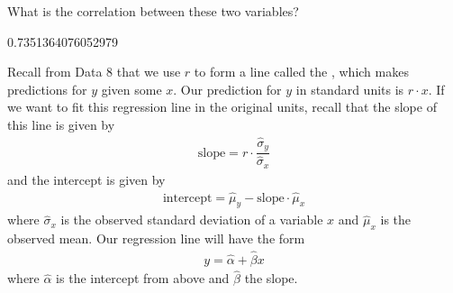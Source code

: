 \documentclass[letterpaper,10pt,english]{jupyterBook}
\begin{document}
\begin{sphinxVerbatim}[commandchars=\\\{\}]
  
       
\end{sphinxVerbatim}

\sphinxAtStartPar
What is the correlation between these two variables?

\begin{sphinxVerbatim}[commandchars=\\\{\}]
 
\end{sphinxVerbatim}

\begin{sphinxVerbatim}[commandchars=\\\{\}]
0.7351364076052979
\end{sphinxVerbatim}

\sphinxAtStartPar
Recall from Data 8 that we use \(r\) to form a line called the , which makes predictions for \(y\) given some \(x\). Our prediction for \(y\) in standard units is \(r \cdot x\). If we want to fit this regression line in the original units, recall that the slope of this line is given by
\begin{equation*}
\begin{split}
\text{slope} = r \cdot \dfrac{\hat{\sigma}_y}{\hat{\sigma}_x}
\end{split}
\end{equation*}
\sphinxAtStartPar
and the intercept is given by
\begin{equation*}
\begin{split}
\text{intercept} = \hat{\mu}_y - \text{slope} \cdot \hat{\mu}_x
\end{split}
\end{equation*}
\sphinxAtStartPar
where \(\hat{\sigma}_x\) is the observed standard deviation of a variable \(x\) and \(\hat{\mu}_x\) is the observed mean. Our regression line will have the form
\begin{equation*}
\begin{split}
y = \hat{\alpha} + \hat{\beta} x
\end{split}
\end{equation*}
\sphinxAtStartPar
where \(\hat{\alpha}\) is the intercept from above and \(\hat{\beta}\) the slope.
\end{document}
